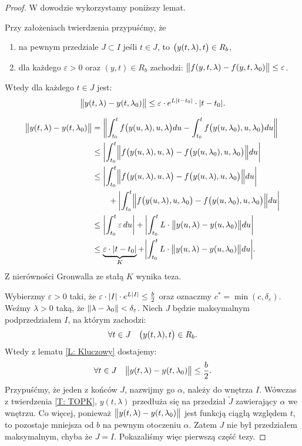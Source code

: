\begin{proof}
  W dowodzie wykorzystamy poniższy lemat.
  \begin{lemma} \label{L: Kluczowy}
    Przy założeniach twierdzenia przypuśćmy, że
    \begin{enumerate}
      \item na pewnym przedziale $J \subset I$ jeśli $t \in J$, to $\p[\big]{y(t,\lambda),t} \in R_b$,
      \item dla każdego $\varepsilon > 0$ oraz $(y,t) \in R_b$ zachodzi:
      $ \norm[\big]{ f(y,t,\lambda) - f(y,t,\lambda_0) } \leq \varepsilon $.
    \end{enumerate}
    Wtedy dla każdego $t \in J$ jest:
    \[
      \norm[\big]{ y(t,\lambda) - y(t,\lambda_0) } \leq \varepsilon \cdot e^{L \abs{t-t_0}} \cdot \abs{t-t_0}.
    \]
  \end{lemma}
  \begin{nestedproof}
    \begin{align*}
      \norm[\big]{ y(t,\lambda) - y(t,\lambda_0) }
      &= \norm*{ \int_{t_0}^t f \p[\big]{ y(u, \lambda), u, \lambda } du - 
          \int_{t_0}^t f\p[\big]{ y(u,\lambda_0), u, \lambda_0 } du} \\
      &\leq \abs*{ \int_{t_0}^t \norm[\Big]{ f \p[\big]{ y(u,\lambda), u, \lambda } - 
          f\p[\big]{ y(u,\lambda_0), u, \lambda_0 } } du } \\
      &\leq \abs*{ \int_{t_0}^t \norm[\Big]{ f \p[\big]{ y(u,\lambda), u, \lambda } - 
          f\p[\big]{ y(u,\lambda), u, \lambda_0 } } du } \\
      &\qquad+ \abs*{ \int_{t_0}^t \norm[\Big]{ f \p[\big]{ y(u,\lambda), u, \lambda_0 } - 
          f\p[\big]{ y(u,\lambda_0), u, \lambda_0 } } du } \\
      &\leq \abs*{\int_{t_0}^t \varepsilon \, du} + 
          \abs*{ \int_{t_0}^t L \cdot \norm[\big]{ y(u,\lambda) - y(u,\lambda_0) } du } \\
      &\leq \underbrace{\varepsilon \cdot \abs*{t-t_0}}_K + 
          \abs*{ \int_{t_0}^t L \cdot \norm[\big]{ y(u,\lambda) - y(u,\lambda_0) } du }.
    \end{align*}
    Z nierówności Gronwalla ze stałą $K$ wynika teza.
  \end{nestedproof}
  Wybierzmy $\varepsilon > 0$ taki, że $\varepsilon \cdot \abs{I} \cdot e^{L \abs{I}} \leq \frac b2$ oraz oznaczmy 
  $c^{\ast} = \min(c,\delta_{\varepsilon})$. Weźmy $\lambda > 0$ taką, że $\norm{\lambda - \lambda_0} < 
  \delta_{\varepsilon}$. Niech $J$ będzie maksymalnym podprzedziałem $I$, na którym zachodzi:
  \[
    \forall t \in J \quad \p[\big]{ y(t,\lambda), t } \in R_b.
  \]
  Wtedy z lematu \ref{L: Kluczowy} dostajemy:
  \[
    \forall t \in J \quad \norm[\big]{ y(t,\lambda) - y(t,\lambda_0) } \leq \frac b2.
  \]
  Przypuśćmy, że jeden z końców $J$, nazwijmy go $\alpha$, należy do wnętrza $I$. Wówczas z twierdzenia \ref{T: TOPK}, 
  $y(t,\lambda)$ przedłuża się na przedział $\widetilde{J}$ zawierający $\alpha$ we wnętrzu. Co więcej, ponieważ 
  $\norm[\big]{ y(t,\lambda) - y(t,\lambda_0) }$ jest funkcją ciągłą względem $t$, to pozostaje mniejsza od $b$ na 
  pewnym otoczeniu $\alpha$. Zatem $J$ nie był przedziałem maksymalnym, chyba że $J = I$. Pokazaliśmy więc pierwszą 
  część tezy.
  

\end{proof}
